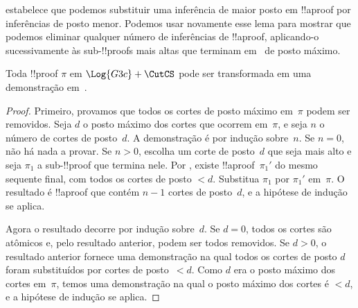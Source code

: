 \documentclass[../../../include/open-logic-section]{subfiles}
\begin{document}
 estabelece que podemos substituir uma
inferência \CutCS{} de maior posto em !!a{proof} por inferências \CutCS{} de
posto menor. Podemos usar novamente esse lema para mostrar que podemos eliminar
qualquer número de inferências \CutCS{} de !!a{proof}, aplicando-o
sucessivamente às sub-!!{proof}s mais altas que terminam em~\CutCS{} de posto máximo.

\begin{thm}
Toda !!{proof} $\pi$ em $\Log{G3c} + \CutCS$ pode ser transformada em uma demonstração em~.
\end{thm}

\begin{proof}
  Primeiro, provamos que todos os cortes de posto máximo em~$\pi$ podem ser
  removidos. Seja $d$ o posto máximo dos cortes que ocorrem em~$\pi$, e
  seja $n$ o número de cortes de posto~$d$. A demonstração é por indução
  sobre~$n$. Se $n=0$, não há nada a provar. Se $n>0$, escolha um corte
  de posto~$d$ que seja mais alto e seja $\pi_1$ a sub-!!{proof} que termina
  nele. Por , existe !!a{proof}~$\pi_1'$ do
  mesmo sequente final, com todos os cortes de posto $<d$. Substitua $\pi_1$
  por $\pi_1'$ em~$\pi$. O resultado é !!a{proof} que contém $n-1$ cortes
  de posto~$d$, e a hipótese de indução se aplica.

  Agora o resultado decorre por indução sobre~$d$. Se $d=0$, todos os cortes
  são atômicos e, pelo resultado anterior, podem ser todos removidos. Se
  $d>0$, o resultado anterior fornece uma demonstração na qual todos os
  cortes de posto $d$ foram substituídos por cortes de posto~$<d$. Como $d$
  era o posto máximo dos cortes em~$\pi$, temos uma demonstração na qual o
  posto máximo dos cortes é $<d$, e a hipótese de indução se aplica.
\end{proof}
\end{document}
